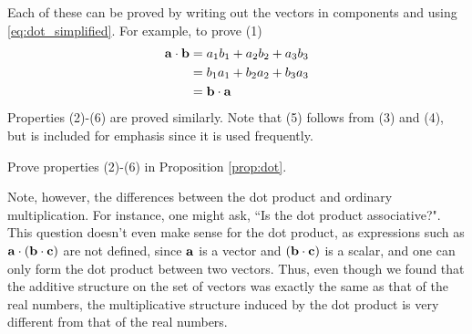 \documentclass[12pt,letterpaper,reqno]{article}
\numberwithin{equation}{section}
\begin{document}
\begin{pf}
Each of these can be proved by writing out the vectors in components and using  \eqref{eq:dot_simplified}. For example, to prove (1)
\begin{align*}
	{\bf a}\cdot {\bf b}&=a_1b_1+a_2b_2+a_3b_3 \\
	&=b_1a_1+b_2a_2+b_3a_3 \\
	&={\bf b}\cdot {\bf a}
\end{align*}
Properties (2)-(6) are proved similarly. Note that (5) follows from (3) and (4), but is included for emphasis since it is used frequently. 	
\end{pf}

\begin{exercise}
Prove properties (2)-(6) in Proposition \ref{prop:dot}.	
\end{exercise}


Note, however, the differences between the dot product and ordinary multiplication. For instance, one might ask, ``Is the dot product associative?". This question doesn't even make sense for the dot product, as expressions such as ${\bf a}\cdot ({\bf b}\cdot {\bf c})$ are not defined, since ${\bf a}$ is a vector and $({\bf b}\cdot {\bf c})$ is a scalar, and one can only form the dot product between two vectors. Thus, even though we found that the additive structure on the set of vectors was exactly the same as that of the real numbers, the multiplicative structure induced by the dot product is very different from that of the real numbers. 
\end{document}
